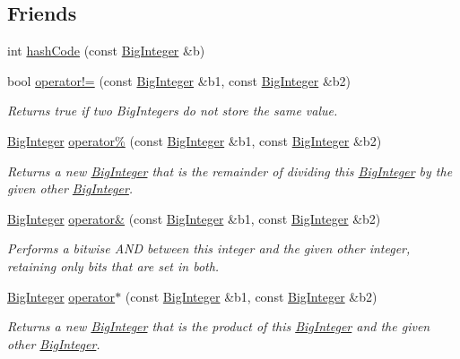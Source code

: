 \subsection*{Friends}
\begin{DoxyCompactItemize}
\item 
int \mbox{\hyperlink{classBigInteger_ac74a763169d0fe1d4d76a891535c8578}{hash\+Code}} (const \mbox{\hyperlink{classBigInteger}{Big\+Integer}} \&b)
\item 
bool \mbox{\hyperlink{classBigInteger_aeebeaf49c2dddc5652c06ea190ff2233}{operator!=}} (const \mbox{\hyperlink{classBigInteger}{Big\+Integer}} \&b1, const \mbox{\hyperlink{classBigInteger}{Big\+Integer}} \&b2)
\begin{DoxyCompactList}\small\item\em Returns true if two Big\+Integers do not store the same value. \end{DoxyCompactList}\item 
\mbox{\hyperlink{classBigInteger}{Big\+Integer}} \mbox{\hyperlink{classBigInteger_a9d102d793991b160ada3d6420e82d8a2}{operator\%}} (const \mbox{\hyperlink{classBigInteger}{Big\+Integer}} \&b1, const \mbox{\hyperlink{classBigInteger}{Big\+Integer}} \&b2)
\begin{DoxyCompactList}\small\item\em Returns a new \mbox{\hyperlink{classBigInteger}{Big\+Integer}} that is the remainder of dividing this \mbox{\hyperlink{classBigInteger}{Big\+Integer}} by the given other \mbox{\hyperlink{classBigInteger}{Big\+Integer}}. \end{DoxyCompactList}\item 
\mbox{\hyperlink{classBigInteger}{Big\+Integer}} \mbox{\hyperlink{classBigInteger_a9264597a13bdae8e51f922f5e86cd98f}{operator\&}} (const \mbox{\hyperlink{classBigInteger}{Big\+Integer}} \&b1, const \mbox{\hyperlink{classBigInteger}{Big\+Integer}} \&b2)
\begin{DoxyCompactList}\small\item\em Performs a bitwise A\+ND between this integer and the given other integer, retaining only bits that are set in both. \end{DoxyCompactList}\item 
\mbox{\hyperlink{classBigInteger}{Big\+Integer}} \mbox{\hyperlink{classBigInteger_a8e6b00948ebc54ab67bb17c41007fb3c}{operator$\ast$}} (const \mbox{\hyperlink{classBigInteger}{Big\+Integer}} \&b1, const \mbox{\hyperlink{classBigInteger}{Big\+Integer}} \&b2)
\begin{DoxyCompactList}\small\item\em Returns a new \mbox{\hyperlink{classBigInteger}{Big\+Integer}} that is the product of this \mbox{\hyperlink{classBigInteger}{Big\+Integer}} and the given other \mbox{\hyperlink{classBigInteger}{Big\+Integer}}. \end{DoxyCompactList}\item 

\end{DoxyCompactItemize}
